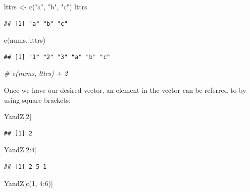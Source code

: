 \documentclass[
]{book}
\newenvironment{Shaded}{\begin{snugshade}}{\end{snugshade}}
\newcommand{\CommentTok}[1]{\textcolor[rgb]{0.56,0.35,0.01}{\textit{#1}}}
\newcommand{\DecValTok}[1]{\textcolor[rgb]{0.00,0.00,0.81}{#1}}
\newcommand{\FunctionTok}[1]{\textcolor[rgb]{0.00,0.00,0.00}{#1}}
\newcommand{\NormalTok}[1]{#1}
\newcommand{\OtherTok}[1]{\textcolor[rgb]{0.56,0.35,0.01}{#1}}
\newcommand{\SpecialCharTok}[1]{\textcolor[rgb]{0.00,0.00,0.00}{#1}}
\newcommand{\StringTok}[1]{\textcolor[rgb]{0.31,0.60,0.02}{#1}}
\begin{document}
\begin{Shaded}
\begin{Highlighting}[]
\NormalTok{lttrs }\OtherTok{\textless{}{-}} \FunctionTok{c}\NormalTok{(}\StringTok{"a"}\NormalTok{, }\StringTok{"b"}\NormalTok{, }\StringTok{"c"}\NormalTok{)}
\NormalTok{lttrs}
\end{Highlighting}
\end{Shaded}

\begin{verbatim}
## [1] "a" "b" "c"
\end{verbatim}

\begin{Shaded}
\begin{Highlighting}[]
\FunctionTok{c}\NormalTok{(nums, lttrs)}
\end{Highlighting}
\end{Shaded}

\begin{verbatim}
## [1] "1" "2" "3" "a" "b" "c"
\end{verbatim}

\begin{Shaded}
\begin{Highlighting}[]
\CommentTok{\# c(nums, lttrs) + 2}
\end{Highlighting}
\end{Shaded}

Once we have our desired vector, an element in the vector can be referred to by using square brackets:

\begin{Shaded}
\begin{Highlighting}[]
\NormalTok{YandZ[}\DecValTok{2}\NormalTok{]}
\end{Highlighting}
\end{Shaded}

\begin{verbatim}
## [1] 2
\end{verbatim}

\begin{Shaded}
\begin{Highlighting}[]
\NormalTok{YandZ[}\DecValTok{2}\SpecialCharTok{:}\DecValTok{4}\NormalTok{]}
\end{Highlighting}
\end{Shaded}

\begin{verbatim}
## [1] 2 5 1
\end{verbatim}

\begin{Shaded}
\begin{Highlighting}[]
\NormalTok{YandZ[}\FunctionTok{c}\NormalTok{(}\DecValTok{1}\NormalTok{, }\DecValTok{4}\SpecialCharTok{:}\DecValTok{6}\NormalTok{)]}
\end{Highlighting}
\end{Shaded}
\end{document}
